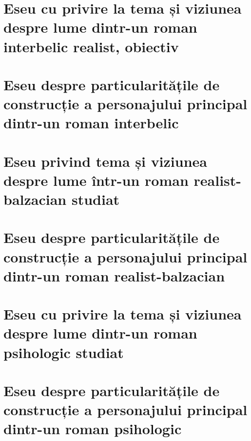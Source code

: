 \documentclass[
 12pt,                       %
 a4paper                     %
]{book}
\begin{document}
\chapter{Eseu cu privire la tema și viziunea despre lume dintr-un roman interbelic realist, obiectiv}


\chapter{Eseu despre particularitățile de construcție a personajului principal dintr-un roman interbelic}



\chapter{Eseu privind tema și viziunea despre lume într-un roman realist-balzacian studiat}


\chapter{Eseu despre particularitățile de construcție a personajului principal dintr-un roman realist-balzacian}



\chapter{Eseu cu privire la tema și viziunea despre lume dintr-un roman psihologic studiat}


\chapter{Eseu despre particularitățile de construcție a personajului principal dintr-un roman psihologic}

\end{document}
